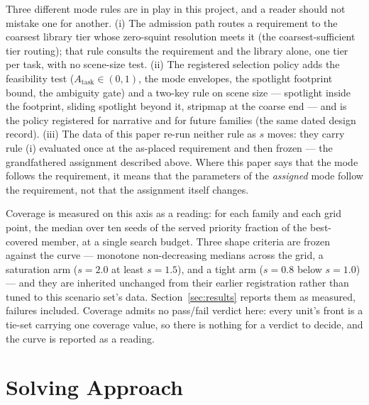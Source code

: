 \documentclass[preprint,authoryear]{elsarticle}
\begin{document}
Three different mode rules are in play in this project, and a reader should not mistake one for another. (i) The admission path routes a requirement to the coarsest library tier whose zero-squint resolution meets it (the coarsest-sufficient tier routing); that rule consults the requirement and the library alone, one tier per task, with no scene-size test. (ii) The registered selection policy adds the feasibility test ($A_{\mathrm{task}}\in(0,1)$, the mode envelopes, the spotlight footprint bound, the ambiguity gate) and a two-key rule on scene size --- spotlight inside the footprint, sliding spotlight beyond it, stripmap at the coarse end --- and is the policy registered for narrative and for future families (the same dated design record). (iii) The data of this paper re-run neither rule as $s$ moves: they carry rule (i) evaluated once at the as-placed requirement and then frozen --- the grandfathered assignment described above. Where this paper says that the mode follows the requirement, it means that the parameters of the \emph{assigned} mode follow the requirement, not that the assignment itself changes.

Coverage is measured on this axis as a reading: for each family and each grid point, the median over ten seeds of the served priority fraction of the best-covered member, at a single search budget. Three shape criteria are frozen against the curve --- monotone non-decreasing medians across the grid, a saturation arm ($s=2.0$ at least $s=1.5$), and a tight arm ($s=0.8$ below $s=1.0$) --- and they are inherited unchanged from their earlier registration rather than tuned to this scenario set's data. Section~\ref{sec:results} reports them as measured, failures included. Coverage admits no pass/fail verdict here: every unit's front is a tie-set carrying one coverage value, so there is nothing for a verdict to decide, and the curve is reported as a reading.

\section{Solving Approach}\label{sec:solver}
\end{document}
